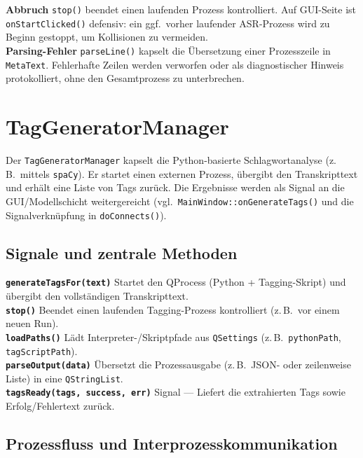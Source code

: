 \textbf{Abbruch} \texttt{stop()} beendet einen laufenden Prozess kontrolliert. Auf GUI-Seite ist \texttt{onStartClicked()} defensiv: ein ggf.\ vorher laufender ASR-Prozess wird zu Beginn gestoppt, um Kollisionen zu vermeiden.\\

\textbf{Parsing-Fehler} \texttt{parseLine()} kapselt die Übersetzung einer Prozesszeile in \texttt{MetaText}. Fehlerhafte Zeilen werden verworfen oder als diagnostischer Hinweis protokolliert, ohne den Gesamtprozess zu unterbrechen.


\section{TagGeneratorManager}
\label{sec:py_tags}

Der \texttt{TagGeneratorManager} kapselt die Python-basierte Schlagwortanalyse (z.\,B.\ mittels \texttt{spaCy}). Er startet einen externen Prozess, übergibt den Transkripttext und erhält eine Liste von Tags zurück. Die Ergebnisse werden als Signal an die GUI/Modellschicht weitergereicht (vgl.\ \texttt{MainWindow::onGenerateTags()} und die Signalverknüpfung in \texttt{doConnects()}).

\subsection*{Signale und zentrale Methoden}

\textbf{\texttt{generateTagsFor(text)}}
Startet den QProcess (Python + Tagging-Skript) und übergibt den vollständigen Transkripttext.\\

\textbf{\texttt{stop()}}
Beendet einen laufenden Tagging-Prozess kontrolliert (z.\,B.\ vor einem neuen Run).\\

\textbf{\texttt{loadPaths()}}
Lädt Interpreter-/Skriptpfade aus \texttt{QSettings} (z.\,B.\ \texttt{pythonPath}, \texttt{tagScriptPath}).\\

\textbf{\texttt{parseOutput(data)}}
Übersetzt die Prozessausgabe (z.\,B.\ JSON- oder zeilenweise Liste) in eine \texttt{QStringList}.\\

\textbf{\texttt{tagsReady(tags, success, err)}}
Signal — Liefert die extrahierten Tags sowie Erfolg/Fehlertext zurück.

\subsection*{Prozessfluss und Interprozesskommunikation}

